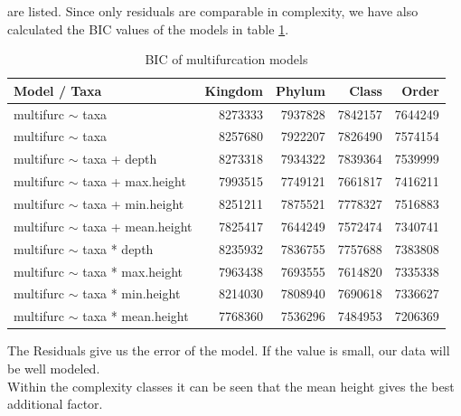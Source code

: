         are listed. Since only residuals are comparable in complexity, we have also calculated the BIC 
        values of the models in table \ref{table:BIC multifurcation}. \\
      \begin{table}[h]
        \begin{center}
          \begin{tabular}{ |l|r|r|r|r| }
            \hline
            Model / Taxa & Kingdom & Phylum & Class & Order \\
            \hline \hline
            multifurc $\sim$ taxa & 8273333 & \cellcolor{green!15}7937828 & \cellcolor{green!20}7842157 & \cellcolor{green!30}7644249 \\
            multifurc $\sim$ taxa & 8257680 & \cellcolor{green!15}7922207 & \cellcolor{green!20}7826490 & \cellcolor{green!35}7574154 \\
            \hline
            multifurc $\sim$ taxa + depth & 8273318 & \cellcolor{green!15}7934322 & \cellcolor{green!20}7839364 & \cellcolor{green!35}7539999 \\
            multifurc $\sim$ taxa + max.height & \cellcolor{green!15}7993515 & \cellcolor{green!25}7749121 & \cellcolor{green!30}7661817 & \cellcolor{green!40}7416211 \\
            multifurc $\sim$ taxa + min.height & 8251211 & \cellcolor{green!20}7875521  & \cellcolor{green!25}7778327 & \cellcolor{green!35}7516883 \\
            multifurc $\sim$ taxa + mean.height & \cellcolor{green!20}7825417 & \cellcolor{green!30}7644249 & \cellcolor{green!35}7572474 & \cellcolor{green!45}7340741 \\
            \hline
            multifurc $\sim$ taxa * depth & 8235932 & \cellcolor{green!20}7836755 & \cellcolor{green!25}7757688 & \cellcolor{green!45}7383808 \\
            multifurc $\sim$ taxa * max.height & \cellcolor{green!15}7963438 & \cellcolor{green!30}7693555 & \cellcolor{green!30}7614820 & \cellcolor{green!45}7335338 \\
            multifurc $\sim$ taxa * min.height & 8214030 & \cellcolor{green!20}7808940 & \cellcolor{green!30}7690618 & \cellcolor{green!45}7336627\\
            multifurc $\sim$ taxa * mean.height & \cellcolor{green!25}7768360 & \cellcolor{green!35}7536296 & \cellcolor{green!50}7484953 & \cellcolor{green!50}7206369 \\
            \hline
          \end{tabular} 
        \end{center}
        \caption{BIC of multifurcation models}
        \label{table:BIC multifurcation} 
      \end{table}
      The Residuals give us the error of the model. If the value is small, our data will be well modeled. \\
      Within the complexity classes it can be seen that the mean height gives the best additional factor. \\
      
